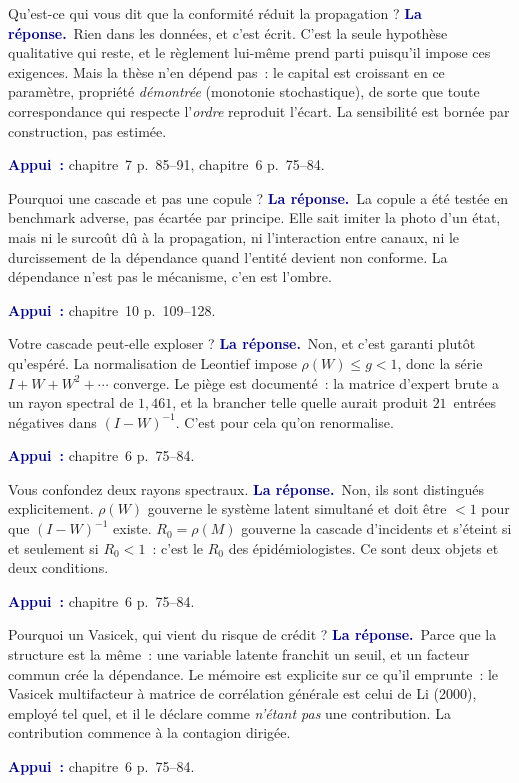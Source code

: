 \documentclass[11pt,a4paper]{article}
\newcommand{\rep}[1]{\smallskip\noindent\textcolor{navy}{\textbf{La réponse.}}\ #1\par}
\newcommand{\appui}[1]{\smallskip\noindent\small\textcolor{navy}{\textbf{Appui~:}} #1\par\normalsize}
\begin{document}
\begin{question}{\og Qu'est-ce qui vous dit que la conformité réduit la propagation ?\fg{}}
\rep{Rien dans les données, et c'est écrit. C'est la seule hypothèse qualitative qui reste, et
le règlement lui-même prend parti puisqu'il impose ces exigences. Mais la thèse n'en dépend pas~:
le capital est croissant en ce paramètre, propriété \emph{démontrée} (monotonie stochastique),
de sorte que toute correspondance qui respecte l'\emph{ordre} reproduit l'écart. La sensibilité
est bornée par construction, pas estimée.}
\appui{chapitre~7 p.~85--91, chapitre~6 p.~75--84.}
\end{question}

\begin{question}{\og Pourquoi une cascade et pas une copule ?\fg{}}
\rep{La copule a été testée en benchmark adverse, pas écartée par principe. Elle sait imiter la
photo d'un état, mais ni le surcoût dû à la propagation, ni l'interaction entre canaux, ni le
durcissement de la dépendance quand l'entité devient non conforme. La dépendance n'est pas le
mécanisme, c'en est l'ombre.}
\appui{chapitre~10 p.~109--128.}
\end{question}

\begin{question}{\og Votre cascade peut-elle exploser ?\fg{}}
\rep{Non, et c'est garanti plutôt qu'espéré. La normalisation de Leontief impose
$\rho(W)\le g<1$, donc la série $I+W+W^2+\cdots$ converge. Le piège est documenté~: la matrice
d'expert brute a un rayon spectral de $1{,}461$, et la brancher telle quelle aurait produit
$21$~entrées négatives dans $(I-W)^{-1}$. C'est pour cela qu'on renormalise.}
\appui{chapitre~6 p.~75--84.}
\end{question}

\begin{question}{\og Vous confondez deux rayons spectraux.\fg{}}
\rep{Non, ils sont distingués explicitement. $\rho(W)$ gouverne le système latent simultané et
doit être $<1$ pour que $(I-W)^{-1}$ existe. $R_0=\rho(M)$ gouverne la cascade d'incidents et
s'éteint si et seulement si $R_0<1$~: c'est le $R_0$ des épidémiologistes. Ce sont deux objets
et deux conditions.}
\appui{chapitre~6 p.~75--84.}
\end{question}

\begin{question}{\og Pourquoi un Vasicek, qui vient du risque de crédit ?\fg{}}
\rep{Parce que la structure est la même~: une variable latente franchit un seuil, et un facteur
commun crée la dépendance. Le mémoire est explicite sur ce qu'il emprunte~: le Vasicek
multifacteur à matrice de corrélation générale est celui de Li (2000), employé tel quel, et il
le déclare comme \emph{n'étant pas} une contribution. La contribution commence à la contagion
dirigée.}
\appui{chapitre~6 p.~75--84.}
\end{question}
\end{document}
